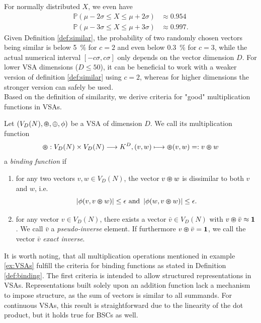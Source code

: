 For normally distributed $X$, we even have
\begin{align*}
	\mathbb{P}\left(\mu-2\sigma \leq X \leq \mu+2\sigma \right) &\approx 0.954 \\
	\mathbb{P}\left(\mu-3\sigma \leq X \leq \mu+3\sigma \right) &\approx 0.997.
\end{align*}
Given Definition \ref{def:similar}, the probability of two randomly chosen vectors being similar is below \SI{5}{\percent} for $c=2$ and even below \SI{0.3}{\percent} for $c=3$, while the actual numerical interval $\left[-c\sigma, c\sigma\right]$ only depends on the vector dimension $D$.
For lower \ac{VSA} dimensions ($D \leq 50$), it can be beneficial to work with a weaker version of definition \ref{def:similar} using $c=2$, whereas for higher dimensions the stronger version can safely be used. \\
Based on the definition of similarity, we derive criteria for "good" multiplication functions in \acp{VSA}.
\begin{defn}
	\label{def:binding}
	Let $(V_{D}(N), \varoast, \oplus, \phi)$ be a \acrfull{VSA} of dimension $D$. We call its multiplication function
	\[\varoast: V_{D}(N) \times V_{D}(N) \longrightarrow K^{D}, (v,w) \longmapsto \varoast(v,w) =: v\varoast w\]
	a \emph{binding function} if
	\begin{enumerate}
		\item for any two vectors $v, w \in V_{D}(N)$, the vector $v \varoast w$ is dissimilar to both $v$ and $w$, i.e.
		\[
		\left| \phi(v,v \varoast w) \right| \leq \epsilon \textrm{ and } \left| \phi(w,v \varoast w) \right| \leq \epsilon.
		\]
		\item for any vector $v \in V_{D}(N)$, there exists a vector $\bar{v} \in V_{D}(N)$ with $v \varoast \bar{v} \approx \mathbf{1}$. We call $\bar{v}$ a \emph{pseudo-inverse} element.
		If furthermore $v \varoast \bar{v} = \mathbf{1}$, we call the vector $\bar{v}$ \emph{exact inverse}.
	\end{enumerate}
\end{defn}
It is worth noting, that all multiplication operations mentioned in example \ref{ex:VSAs} fulfill the criteria for binding functions as stated in Definition \ref{def:binding}.
The first criteria is intended to allow structured representations in \acp{VSA}.
Representations built solely upon an addition function lack a mechanism to impose structure, as the sum of vectors is similar to all summands.
For continuous \acp{VSA}, this result is straightforward due to the linearity of the dot product, but it holds true for \acp{BSC} as well.
